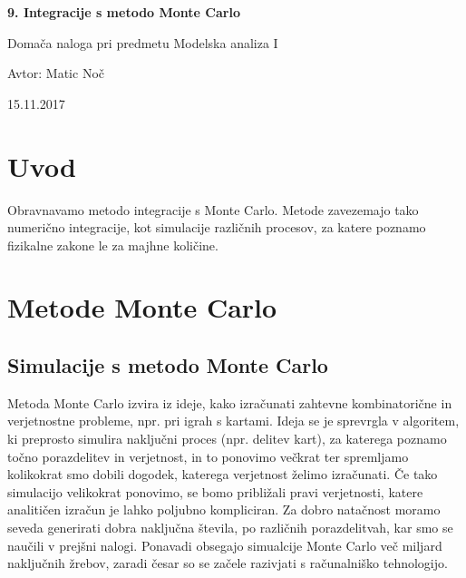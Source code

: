 \documentclass[11pt, a4paper]{article}
\begin{document}
    \begin{center}
    {\LARGE\bfseries 9. Integracije s metodo Monte Carlo \par}
    \vspace{1cm}
    
    {\Large Domača naloga pri predmetu Modelska analiza I\par}
    \vspace{0.2cm}
    {\normalsize Avtor: Matic Noč \par}
    \vspace{0.2cm}    
    {\normalsize 15.11.2017 \par}    

    
    \end{center}
\section{Uvod}
Obravnavamo metodo integracije s Monte Carlo. Metode zavezemajo tako numerično integracije, kot simulacije različnih procesov, za katere poznamo fizikalne zakone le za majhne količine. 
\section{Metode Monte Carlo}
\subsection{Simulacije s metodo Monte Carlo}
Metoda Monte Carlo izvira iz ideje, kako izračunati zahtevne kombinatorične in verjetnostne probleme, npr. pri igrah s kartami. Ideja se je sprevrgla v algoritem, ki preprosto simulira naključni proces (npr. delitev kart), za katerega poznamo točno porazdelitev in verjetnost, in to ponovimo večkrat ter spremljamo kolikokrat smo dobili dogodek, katerega verjetnost želimo izračunati. Če tako simulacijo velikokrat ponovimo, se bomo približali pravi verjetnosti, katere analitičen izračun je lahko poljubno kompliciran.\newline\newline 
Za dobro natačnost moramo seveda generirati dobra naključna števila, po različnih porazdelitvah, kar smo se naučili v prejšni nalogi. Ponavadi obsegajo simualcije Monte Carlo več miljard naključnih žrebov, zaradi česar so se začele razivjati s računalniško tehnologijo.
\end{document}
